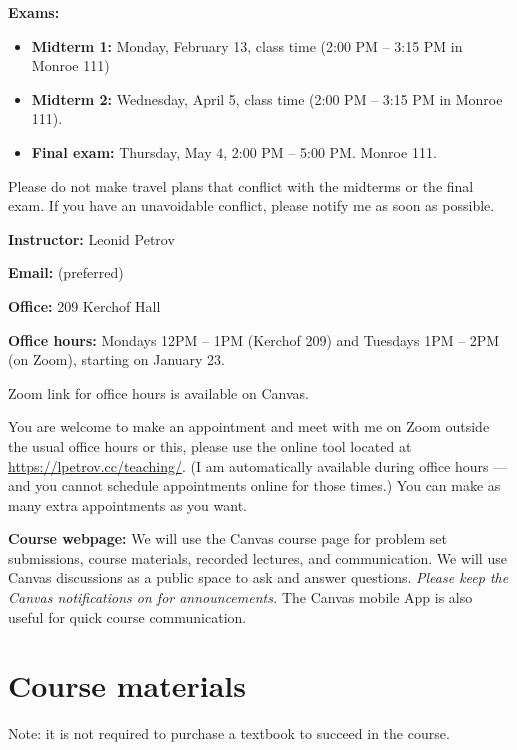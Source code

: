 \documentclass[oneside,11pt]{amsart}
\begin{document}
\medskip

\textbf{Exams:}
\begin{itemize}
	\item \textbf{Midterm 1:} Monday, February 13, class time (2:00 PM -- 3:15 PM in Monroe 111)
	\item \textbf{Midterm 2:} Wednesday, April 5, class time (2:00 PM -- 3:15 PM in Monroe 111).
	\item \textbf{Final exam:} Thursday, May 4, 2:00 PM -- 5:00 PM. Monroe 111.
\end{itemize}
Please do not make travel plans that conflict
with the midterms or the final exam. If you have an unavoidable conflict, please notify me as soon as possible.

\medskip

\textbf{Instructor:} Leonid Petrov
\medskip

\textbf{Email:}  (preferred)
\medskip

\textbf{Office:} 209 Kerchof Hall
\medskip

\textbf{Office hours:}
Mondays 12PM -- 1PM (Kerchof 209) and Tuesdays 1PM -- 2PM (on Zoom), starting on January 23.

Zoom link for office hours is available on Canvas.

\medskip

You are welcome to make an appointment and meet with me on Zoom outside the usual office hours
or this, please use the online tool located at
\url{https://lpetrov.cc/teaching/}. (I am automatically available during office hours --- 
and you cannot schedule appointments online for those times.)
You can make as 
many extra appointments as you want.

\medskip

\textbf{Course webpage:}
We will use the Canvas course page for problem set submissions, course materials, recorded 
lectures, and communication. We will use Canvas discussions as a public space to ask and answer questions. 
\textit{Please keep the Canvas notifications on for announcements.}
The Canvas mobile App is also useful for quick course communication.

\section{Course materials}
\label{sec:textbook}

Note: it is not required to purchase a textbook to succeed in the course.

\medskip
\end{document}
